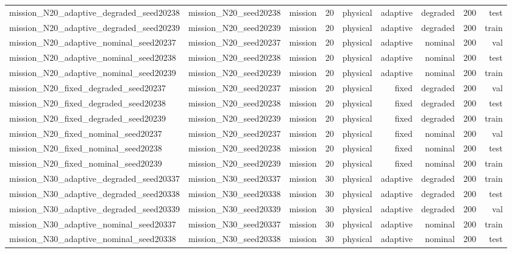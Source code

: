 \begin{tabular}{lrrrrrrrr}
mission\_N20\_adaptive\_degraded\_seed20238 & mission\_N20\_seed20238 & mission & 20 & physical & adaptive & degraded & 200 & test \\
mission\_N20\_adaptive\_degraded\_seed20239 & mission\_N20\_seed20239 & mission & 20 & physical & adaptive & degraded & 200 & train \\
mission\_N20\_adaptive\_nominal\_seed20237 & mission\_N20\_seed20237 & mission & 20 & physical & adaptive & nominal & 200 & val \\
mission\_N20\_adaptive\_nominal\_seed20238 & mission\_N20\_seed20238 & mission & 20 & physical & adaptive & nominal & 200 & test \\
mission\_N20\_adaptive\_nominal\_seed20239 & mission\_N20\_seed20239 & mission & 20 & physical & adaptive & nominal & 200 & train \\
mission\_N20\_fixed\_degraded\_seed20237 & mission\_N20\_seed20237 & mission & 20 & physical & fixed & degraded & 200 & val \\
mission\_N20\_fixed\_degraded\_seed20238 & mission\_N20\_seed20238 & mission & 20 & physical & fixed & degraded & 200 & test \\
mission\_N20\_fixed\_degraded\_seed20239 & mission\_N20\_seed20239 & mission & 20 & physical & fixed & degraded & 200 & train \\
mission\_N20\_fixed\_nominal\_seed20237 & mission\_N20\_seed20237 & mission & 20 & physical & fixed & nominal & 200 & val \\
mission\_N20\_fixed\_nominal\_seed20238 & mission\_N20\_seed20238 & mission & 20 & physical & fixed & nominal & 200 & test \\
mission\_N20\_fixed\_nominal\_seed20239 & mission\_N20\_seed20239 & mission & 20 & physical & fixed & nominal & 200 & train \\
mission\_N30\_adaptive\_degraded\_seed20337 & mission\_N30\_seed20337 & mission & 30 & physical & adaptive & degraded & 200 & train \\
mission\_N30\_adaptive\_degraded\_seed20338 & mission\_N30\_seed20338 & mission & 30 & physical & adaptive & degraded & 200 & test \\
mission\_N30\_adaptive\_degraded\_seed20339 & mission\_N30\_seed20339 & mission & 30 & physical & adaptive & degraded & 200 & val \\
mission\_N30\_adaptive\_nominal\_seed20337 & mission\_N30\_seed20337 & mission & 30 & physical & adaptive & nominal & 200 & train \\
mission\_N30\_adaptive\_nominal\_seed20338 & mission\_N30\_seed20338 & mission & 30 & physical & adaptive & nominal & 200 & test \\

\end{tabular}
